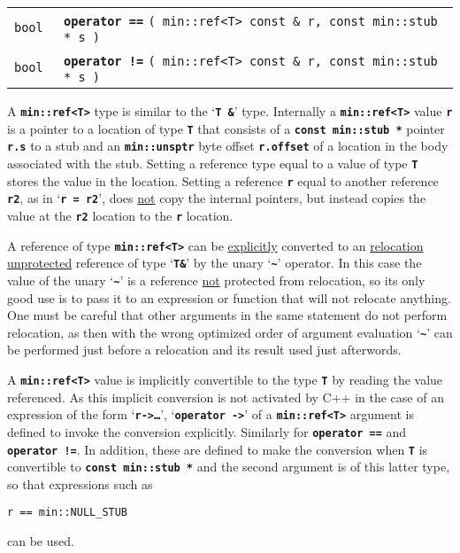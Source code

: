 \documentclass[12pt]{article}
\makeatletter
\newcommand{\TT}[1]{{\tt \bfseries #1}}
\newcommand{\ttomkey}[3]{\TT{operator #2}\index{#1@{\tt operator #2}!{#3}}}
\newcommand{\EOL}{\penalty \exhyphenpenalty}
\newenvironment{indpar}[1][0.3in]%
	{\begin{list}{}%
		     {\setlength{\itemsep}{0in}%
		      \setlength{\topsep}{0in}%
		      \setlength{\parsep}{1ex}%
		      \setlength{\labelwidth}{#1}%
		      \setlength{\leftmargin}{#1}%
		      \addtolength{\leftmargin}{\labelsep}}%
	 \item}%
	{\end{list}}
\newcommand{\LABEL}[1]{\label{#1}}
\newcommand{\TTOMKEY}[3]{\ttomkey{#1}{#2}{#3}}
\makeatother
\begin{document}
\begin{indpar}\begin{tabular}{r@{}l}
\verb|bool |
    & \TTOMKEY{==}{==}{of {\tt min::ref<T>}}
      \verb|( min::ref<T> const & r, const min::stub * s )|
\LABEL{MIN::==REF_AND_STUB} \\
\verb|bool |
    & \TTOMKEY{!=}{!=}{of {\tt min::ref<T>}}
      \verb|( min::ref<T> const & r, const min::stub * s )|
\LABEL{MIN::!=REF_AND_STUB} \\
\end{tabular}\end{indpar}

A \TT{min::ref<T>} type is similar to the `\TT{T \&}' type.
Internally a \TT{min::ref<T>} value \TT{r}
is a pointer to a location of type \TT{T} that
consists of a \TT{const min::\EOL stub~*} pointer \TT{r.s} to a stub
and an \TT{min::\EOL unsptr} byte offset \TT{r.offset}
of a location in the body
associated with the stub.  Setting a reference type equal to a value
of type \TT{T} stores the value in the location.  Setting a reference
\TT{r} equal to another reference \TT{r2}, as in `\TT{r~=~r2}', does
\underline{not} copy the internal pointers, but instead copies the
value at the \TT{r2} location to the \TT{r} location.

A reference of type \TT{min::ref<T>} can be \underline{explicitly} converted
to an \underline{relocation unprotected}
reference of type `\TT{T\&}' by the unary `\TT{\textasciitilde}' operator.
In this case the value of the unary `\TT{\textasciitilde}'
is a reference \underline{not}
protected from relocation, so its only good use is to pass it to an
expression or function that will not relocate anything.
One must be careful that other arguments in the same statement
do not perform relocation, as then with the wrong optimized
order of argument evaluation `\TT{\textasciitilde}'
can be performed just before a
relocation and its result used just afterwords.

A \TT{min::ref<T>} value is implicitly convertible to the type \TT{T}
by reading the value referenced.
As this implicit conversion
is not activated by C++ in the case of an expression of the form
`\TT{r->\ldots}'\label{REF->},
`\TT{operator~->}' of a \TT{min::\EOL ref<T>}
argument is defined to invoke the conversion explicitly.
Similarly for \TT{operator ==} and \TT{operator !=}.
In addition, these are defined to make the conversion when
\TT{T} is convertible to \TT{const min::\EOL stub~*} and the
second argument is of this latter type, so that expressions such as
\begin{center}
\tt r == min::NULL\_STUB
\end{center}
can be used.
\end{document}
